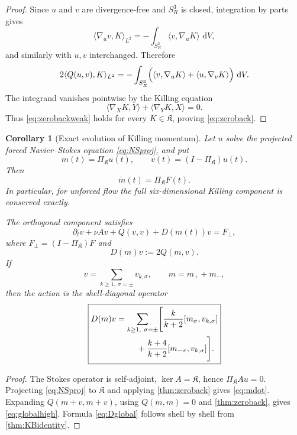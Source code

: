 \documentclass[
 aps,
 prd,
 reprint,
 amsmath,
 amssymb,
 nofootinbib,
 superscriptaddress
]{revtex4-2}
\newtheorem{corollary}[theorem]{Corollary}
\theoremstyle{definition}
\theoremstyle{remark}
\newcommand{\Sthree}{S^3_R}
\newcommand{\cK}{\mathfrak K}
\newcommand{\dd}{\,\mathrm d}
\begin{document}
\begin{proof}
Since $u$ and $v$ are divergence-free and $\Sthree$ is closed,
integration by parts gives
\[
 \langle \nabla_u v,K\rangle_{L^2}
 =
 -\int_{\Sthree}\langle v,\nabla_uK\rangle\,\dd V,
\]
and similarly with $u,v$ interchanged.  Therefore
\[
 2\langle Q(u,v),K\rangle_{L^2}
 =
 -\int_{\Sthree}
 \Bigl(
 \langle v,\nabla_uK\rangle+
 \langle u,\nabla_vK\rangle
 \Bigr)\,\dd V.
\]
The integrand vanishes pointwise by the Killing equation
\[
 \langle\nabla_XK,Y\rangle+\langle\nabla_YK,X\rangle=0.
\]
Thus \eqref{eq:zerobackweak} holds for every $K\in\cK$, proving
\eqref{eq:zeroback}.
\end{proof}

\begin{corollary}[Exact evolution of Killing momentum]
\label{cor:Kmomentum}
Let $u$ solve the projected forced Navier--Stokes equation
\eqref{eq:NSproj}, and put
\[
 m(t)=\Pi_{\cK}u(t),\qquad
 v(t)=(I-\Pi_{\cK})u(t).
\]
Then
\begin{equation}
 \boxed{
 \dot m(t)=\Pi_{\cK}F(t).
 }
 \label{eq:mdot}
\end{equation}
In particular, for unforced flow the full six-dimensional Killing component
is conserved exactly.

The orthogonal component satisfies
\begin{equation}
 \boxed{
 \partial_t v+\nu Av+Q(v,v)+D(m(t))v=F_\perp,
 }
 \label{eq:globalhigh}
\end{equation}
where $F_\perp=(I-\Pi_{\cK})F$ and
\begin{equation}
 D(m)v:=2Q(m,v).
 \label{eq:Dglobaldef}
\end{equation}
If
\[
 v=\sum_{k\ge1,\ \sigma=\pm}v_{k,\sigma},
 \qquad
 m=m_++m_-,
\]
then the action is the shell-diagonal operator
\begin{equation}
\boxed{
\begin{aligned}
 D(m)v
 &=
 \sum_{k\ge1,\ \sigma=\pm}
 \Biggl[
 \frac{k}{k+2}[m_\sigma,v_{k,\sigma}]\\
 &\hspace{2.5em}
 +
 \frac{k+4}{k+2}[m_{-\sigma},v_{k,\sigma}]
 \Biggr].
\end{aligned}}
\label{eq:Dglobal}
\end{equation}
\end{corollary}

\begin{proof}
The Stokes operator is self-adjoint, $\ker A=\cK$, hence
$\Pi_{\cK}Au=0$.  Projecting \eqref{eq:NSproj} to $\cK$ and applying
\cref{thm:zeroback} gives \eqref{eq:mdot}.  Expanding
$Q(m+v,m+v)$, using $Q(m,m)=0$ and \cref{thm:zeroback}, gives
\eqref{eq:globalhigh}.  Formula \eqref{eq:Dglobal} follows shell by shell
from \cref{thm:KBidentity}.
\end{proof}
\end{document}
